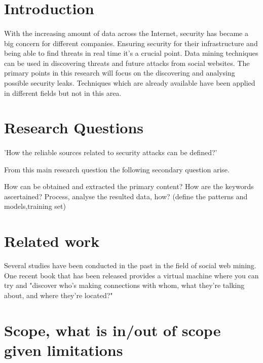 \documentclass[12pt]{article}
\begin{document}
\tableofcontents

\newpage

\section*{Introduction}
\paragraph{}
With the increasing amount of data across the Internet, security has became a big concern for different companies. Ensuring security for their infrastructure and being able to find threats in real time it's a crucial point. Data mining techniques can be used in discovering threats and future attacks from social websites. The primary points in this research will focus on the discovering and analysing possible security leaks. Techniques which are already available have been applied in different fields but not in this area.

\section{Research Questions}
\paragraph{}

'How the reliable sources related to security attacks can be defined?'

From this main research question the following secondary question arise. 

How can be obtained and extracted the primary content?
How are the keywords ascertained?
Process, analyse the resulted data, how? (define the patterns and models,training set)


\section{Related work}

Several studies have been conducted in the past in the field of social web mining. One recent book that has been released provides a virtual machine where you can try and "discover who’s making connections with whom, what they’re talking about, and where they’re located?" \cite{first}

\section{Scope, what is in/out of scope given limitations}
\end{document}
